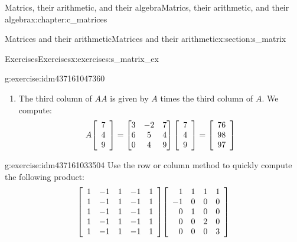 \documentclass[oneside,10pt,]{book}
\numberwithin{equation}{section}
\newenvironment{amatrix}[1][ccc|c]{\left[\begin{array}{#1}}{\end{array}\right]}
\newcommand{\colvec}[2][c]{\begin{amatrix}[#1] #2 \end{amatrix}}
\newcommand{\amp}{&}
\begin{document}
\begin{chapterptx}{Matrics, their arithmetic, and their algebra}{}{Matrics, their arithmetic, and their algebra}{}{}{x:chapter:c_matrices}
\begin{sectionptx}{Matrices and their arithmetic}{}{Matrices and their arithmetic}{}{}{x:section:s_matrix}
\begin{exercises-subsection-numberless}{Exercises}{}{Exercises}{}{}{x:exercises:s_matrix_ex}
\begin{divisionexercise}{3}{}{}{g:exercise:idm437161047360}
\begin{enumerate}[marker=(\alph*)]
\begin{align*}
\begin{amatrix}[rrr]6\amp -2\amp 4\\ 0\amp 1\amp 3\\ 7\amp 7\amp 5 \end{amatrix}\amp =0 \begin{amatrix}[rrr]6\amp -2\amp 4  \end{amatrix}+1 \begin{amatrix}[rrr]0\amp 1\amp 3  \end{amatrix}+3 \begin{amatrix}[rrr]7\amp 7\amp 5  \end{amatrix}\\
\amp=\begin{amatrix}[rrr]21\amp 22\amp 18  \end{amatrix}
\end{align*}
%
\item{}The third column of \(AA\) is given by \(A\) times the third column of \(A\). We compute:%
\begin{equation*}
A\colvec{7 \\ 4 \\ 9}=\begin{bmatrix}3\amp -2\amp 7\\ 6\amp 5\amp 4\\ 0\amp 4\amp 9 \end{bmatrix} \colvec{7 \\ 4 \\ 9}=\colvec{76\\98\\97}
\end{equation*}
%
\end{enumerate}
\end{divisionexercise}%
\begin{divisionexercise}{4}{}{}{g:exercise:idm437161033504}%
Use the row or column method to quickly compute the following product:%
\begin{equation*}
\begin{amatrix}[rrrrr]1\amp -1\amp 1\amp -1\amp 1\\ 1\amp -1\amp 1\amp -1\amp 1\\ 1\amp -1\amp 1\amp -1\amp 1\\ 1\amp -1\amp 1\amp -1\amp 1\\ 1\amp -1\amp 1\amp -1\amp 1 \end{amatrix}
\begin{amatrix}[rrrr]1\amp 1\amp 1\amp 1\\ -1\amp 0\amp 0\amp 0\\ 0\amp 1\amp 0\amp 0\\ 0\amp 0\amp 2\amp 0\\ 0\amp 0\amp 0\amp 3 \end{amatrix}

\end{equation*}
\end{divisionexercise}
\end{exercises-subsection-numberless}
\end{sectionptx}
\end{chapterptx}
\end{document}
